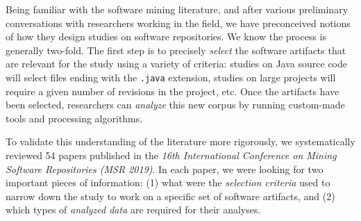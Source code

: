 Being familiar with the software mining literature, and after various
preliminary conversations with researchers working in the field, we have
preconceived notions of how they design studies on software repositories. We
know the process is generally two-fold. The first step is to precisely
\emph{select} the software artifacts that are relevant for the study using a
variety of criteria: studies on Java source code will select files ending with
the \texttt{.java} extension, studies on large projects will require a given
number of revisions in the project, etc. Once the artifacts have been selected,
researchers can \emph{analyze} this new corpus by running custom-made tools and
processing algorithms.

To validate this understanding of the literature more rigorously, we
systematically reviewed 54 papers published in the \emph{16th International
Conference on Mining Software Repositories (MSR 2019)}. In each paper, we were
looking for two important pieces of information: (1) what were the
\emph{selection criteria} used to narrow down the study to work on a specific
set of software artifacts, and (2) which types of \emph{analyzed data} are
required for their analyses.

